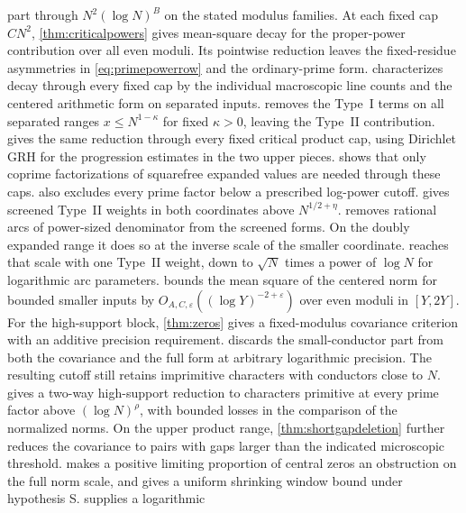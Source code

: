 \documentclass[11pt,a4paper]{article}
\numberwithin{equation}{section}
\begin{document}
part through $N^2(\log N)^B$ on the stated modulus families.
At each fixed cap $CN^2$, \cref{thm:criticalpowers} gives
mean-square decay for the proper-power contribution over
all even moduli. Its pointwise reduction leaves the
fixed-residue asymmetries in \cref{eq:primepowerrow} and
the ordinary-prime form.
 characterizes decay through
every fixed cap by the individual macroscopic line counts
and the centered arithmetic form on separated inputs.
 removes the Type~I terms on
all separated ranges $x\le N^{1-\kappa}$ for fixed
$\kappa>0$, leaving the Type~II contribution.
 gives the same reduction
through every fixed critical product cap, using Dirichlet
GRH for the progression estimates in the two upper pieces.
 shows that only
coprime factorizations of squarefree expanded values
are needed through these caps.
 also excludes every prime
factor below a prescribed log-power cutoff.
 gives screened Type~II
weights in both coordinates above $N^{1/2+\eta}$.
 removes rational arcs of
power-sized denominator from the screened forms. On
the doubly expanded range it does so at the inverse
scale of the smaller coordinate.
 reaches that scale with
one Type~II weight, down to $\sqrt N$ times a power of
$\log N$ for logarithmic arc parameters.
 bounds the mean square of the
centered norm for bounded smaller inputs by
$O_{A,C,\varepsilon}((\log Y)^{-2+\varepsilon})$ over even
moduli in $[Y,2Y]$.
For the high-support block, \cref{thm:zeros} gives a fixed-modulus
covariance criterion with an additive precision requirement.
 discards the small-conductor part
from both the covariance and the full form at arbitrary
logarithmic precision. The resulting cutoff still retains
imprimitive characters with conductors close to $N$.
 gives a two-way high-support
reduction to characters primitive at every prime factor
above $(\log N)^\rho$, with bounded losses in the comparison
of the normalized norms.
On the upper product range, \cref{thm:shortgapdeletion}
further reduces the covariance to pairs with gaps larger
than the indicated microscopic threshold.
 makes a positive
limiting proportion of central zeros an obstruction
on the full norm scale, and gives a uniform shrinking
window bound under hypothesis S.
 supplies a logarithmic
\end{document}

